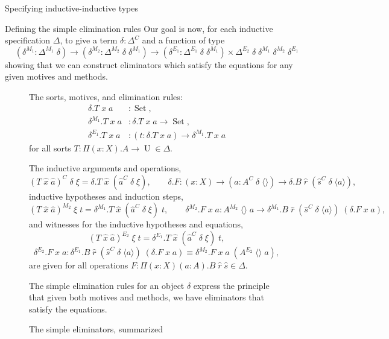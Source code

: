 \documentclass[runningheads]{llncs}
\DeclareMathOperator{\USet}{Set}
\DeclareMathOperator{\UU}{U}
\newcommand{\Id}[2]{{#1}\equiv{#2}}
\def\emptytuple{\langle\rangle}
\begin{document}
{\begin{section}{Specifying inductive-inductive types}
\begin{subsection}{\label{simple-elim-section}Defining the simple elimination rules}
Our goal is now, for each inductive specification $\Delta$, to give a term $\delta : \Delta^C$ and a function of type \[(\delta^{M_1} : \Delta^{M_1}\;\delta) \to (\delta^{M_2} : \Delta^{M_2}\;\delta\;\delta^{M_1}) \to (\delta^{E_1} : \Delta^{E_1}\;\delta\;\delta^{M_1}) \times \Delta^{E_2}\;\delta\;\delta^{M_1}\;\delta^{M_2}\;\delta^{E_1}\] showing that we can construct eliminators which satisfy the equations for any given motives and methods.

\begin{figure}[htpb]
    \begin{flushleft}
        The sorts, motives, and elimination rules:
        \begin{align*}
        \delta.T\;x\;a &: \USet,\\
        \delta^{M_1}.T\;x\;a &: \delta.T\;x\;a \to \USet,\\
        \delta^{E_1}.T\;x\;a &: (t : \delta.T\;x\;a) \to \delta^{M_1}.T\;x\;a
        \end{align*}
        for all sorts $T : \Pi(x : X).A\to\UU \in\Delta$.
        
        The inductive arguments and operations,
        \[(T\;\hat{x}\;\hat{a})^C\;\delta\;\xi = \delta.T\;\hat{x}\;(\hat{a}^C\;\delta\;\xi),
        \qquad\delta.F : (x : X) \to (a : A^C\;\delta\;\emptytuple) \to \delta.B\;\hat{r}\;(\hat{s}^C\;\delta\;\langle a\rangle),\]
        inductive hypotheses and induction steps,
        \[(T\;\hat{x}\;\hat{a})^{M_2}\;\xi\;t = \delta^{M_1}.T\;\hat{x}\;(\hat{a}^C\;\delta\;\xi)\;t,
        \qquad\delta^{M_2}.F\;x\;a : A^{M_2}\;\emptytuple\;a \to \delta^{M_1}.B\;\hat{r}\;(\hat{s}^C\;\delta\;\langle a \rangle)\;(\delta.F\;x\;a),\]
        and witnesses for the inductive hypotheses and equations,
        \[(T\;\hat{x}\;\hat{a})^{E_2}\;\xi\;t = \delta^{E_1}.T\;\hat{x}\;(\hat{a}^C\;\delta\;\xi)\;t,\]
        \[\delta^{E_2}.F\;x\;a : \Id{\delta^{E_1}.B\;\hat{r}\;(\hat{s}^C\;\delta\;\langle a \rangle)\;(\delta.F\;x\;a)}{\delta^{M_2}.F\;x\;a\;(A^{E_2}\;\emptytuple\;a)},\]
        are given for all operations $F : \Pi(x : X)(a : A).B\;\hat{r}\;\hat{s} \in \Delta$.
        
        The simple elimination rules for an object $\delta$ express the principle that given both motives and methods, we have eliminators that satisfy the equations.
    \end{flushleft}
    
    \caption{\label{simple-elim-translation}The simple eliminators, summarized}
\end{figure}


\end{subsection}
\end{section}}
\end{document}
